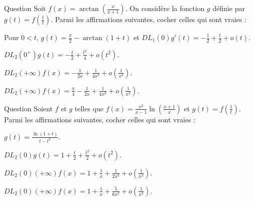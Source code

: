\begin{multi}[multiple,feedback=
{Pour \(0<t\), on a : \(\displaystyle g(t)=\arctan\left(\frac{1}{1+t}\right)=\frac{\pi}{2}-\arctan (1+t)\) et
\[g'(t)=\frac{-1}{1+(1+t)^2}=\frac{-1}{2}\times \frac{1}{1+(t+t^2/2)}=-\frac{1}{2}+\frac{t}{2}+o(t).\]
Par intégration, et puisque \(\displaystyle \arctan 1=\frac{\pi}{4}\), on obtient :
\[DL_2(0^+)g(t)=\frac{\pi}{4}-\frac{t}{2}+\frac{t^2}{4}+o(t^2)\Rightarrow DL_2(+\infty)f(x)=\frac{\pi}{4}-\frac{1}{2x}+\frac{1}{4x^2}+o\left(\frac{1}{x^2}\right).\]
}]{Question}
Soit \(\displaystyle f(x)=\arctan\left(\frac{x}{x+1}\right)\). On considère la fonction \(g\) définie par \(\displaystyle g(t)=f\left(\frac{1}{t}\right)\). Parmi les affirmations suivantes, cocher celles qui sont vraies :

    \item* Pour \(0<t\), \(\displaystyle g(t)=\frac{\pi}{2}-\arctan (1+t)\) et \(\displaystyle DL_1(0)g'(t)=-\frac{1}{2}+\frac{t}{2}+o(t)\).
    \item \(\displaystyle DL_2(0^+)g(t)=-\frac{t}{2}+\frac{t^2}{4}+o(t^2)\).
    \item \(\displaystyle DL_2(+\infty)f(x)=-\frac{1}{2x}+\frac{1}{4x^2}+o\left(\frac{1}{x^2}\right)\).
    \item* \(\displaystyle DL_2(+\infty)f(x)=\frac{\pi}{4}-\frac{1}{2x}+\frac{1}{4x^2}+o\left(\frac{1}{x^2}\right)\).
\end{multi}


\begin{multi}[multiple,feedback=
{D'abord \(\displaystyle g(t)=\frac{\ln (1+t)}{t-t^2}=1+\frac{t}{2}+\frac{5t^2}{6}+o(t^2)\). Donc
\[DL_2(+\infty)f(x)=1+\frac{1}{x}+\frac{5}{6x^2}+o\left(\frac{1}{x^2}\right).\]
}]{Question}
Soient \(f\) et \(g\) telles que \(\displaystyle f(x)=\frac{x^2}{x-1}\ln\left(\frac{x+1}{x}\right)\) et \(\displaystyle g(t)=f\left(\frac{1}{t}\right)\). Parmi les affirmations suivantes, cocher celles qui sont vraies :

    \item* \(\displaystyle g(t)=\frac{\ln (1+t)}{t-t^2}\).
    \item \(\displaystyle DL_2(0)g(t)=1+\frac{t}{2}+\frac{t^2}{2}+o(t^2)\).
    \item \(\displaystyle DL_2(0)(+\infty)f(x)=1+\frac{1}{x}+\frac{1}{2x^2}+o\left(\frac{1}{x^2}\right)\).
    \item* \(\displaystyle DL_2(0)(+\infty)f(x)=1+\frac{1}{x}+\frac{5}{6x^2}+o\left(\frac{1}{x^2}\right)\).
\end{multi}



